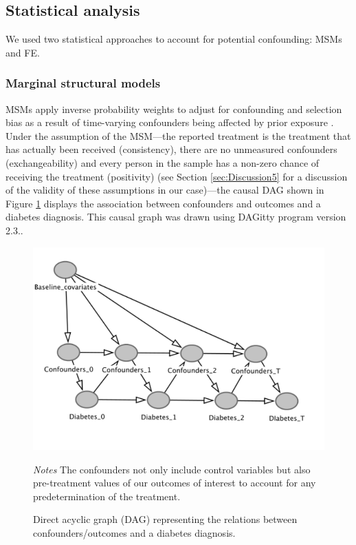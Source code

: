 \subsection{Statistical analysis}


We used two statistical approaches to account for potential confounding: \acfp{MSM} and \acf{FE}. 

\subsubsection*{Marginal structural models}

\acp{MSM} apply inverse probability weights to adjust for confounding and selection bias as a result of time-varying confounders being affected by prior exposure \autocite{Robins2000}. Under the assumption of the \ac{MSM}\autocite{Robins2000}---the reported treatment is the treatment that has actually been received (consistency), there are no unmeasured confounders (exchangeability) and every person in the sample has a non-zero chance of receiving the treatment (positivity) (see Section \ref{sec:Discussion5} for a discussion of the validity of these assumptions in our case)---the causal DAG shown in Figure \ref{fig:DAG} displays the association between confounders and outcomes and a diabetes diagnosis. This causal graph was drawn using DAGitty program version 2.3.\autocite{Textor2011}.

\begin{figure}
\begin{center}
\caption{\label{fig:DAG} Direct acyclic graph (DAG) representing the relations between confounders/outcomes and a diabetes diagnosis.}
\includegraphics[scale=0.7]{Chapter5/Figures/dag}
\end{center}
\footnotesize{\textit{Notes} The confounders not only include control variables but also pre-treatment values of our outcomes of interest to account for any predetermination of the treatment.}

\end{figure}


